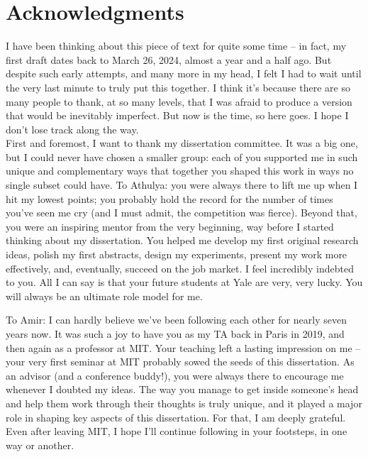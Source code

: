 

\chapter*{Acknowledgments}


I have been thinking about this piece of text for quite some time -- in fact, my first draft dates back to March 26, 2024, almost a year and a half ago. But despite such early attempts, and many more in my head, I felt I had to wait until the very last minute to truly put this together. I think it's because there are so many people to thank, at so many levels, that I was afraid to produce a version that would be inevitably imperfect. But now is the time, so here goes. I hope I don't lose track along the way.\\

First and foremost, I want to thank my dissertation committee. It was a big one, but I could never have chosen a smaller group: each of you supported me in such unique and complementary ways that together you shaped this work in ways no single subset could have.
To Athulya: you were always there to lift me up when I hit my lowest points; you probably hold the record for the number of times you've seen me cry (and I must admit, the competition was fierce). Beyond that, you were an inspiring mentor from the very beginning, way before I started thinking about my dissertation. You helped me develop my first original research ideas, polish my first abstracts, design my experiments, present my work more effectively, and, eventually, succeed on the job market. I feel incredibly indebted to you. All I can say is that your future students at Yale are very, very lucky. You will always be an ultimate role model for me.

To Amir: I can hardly believe we've been following each other for nearly seven years now. It was such a joy to have you as my TA back in Paris in 2019, and then again as a professor at MIT. Your teaching left a lasting impression on me -- your very first seminar at MIT probably sowed the seeds of this dissertation. As an advisor (and a conference buddy!), you were always there to encourage me whenever I doubted my ideas. The way you manage to get inside someone's head and help them work through their thoughts is truly unique, and it played a major role in shaping key aspects of this dissertation. For that, I am deeply grateful. Even after leaving MIT, I hope I'll continue following in your footsteps, in one way or another.

